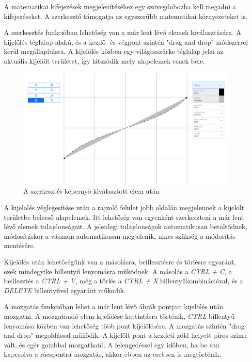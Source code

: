 A matematikai kifejezések megjelenítéséhez egy szövegdobozba kell megadni a kifejezéseket. A szerkesztő támogatja az egyszerűbb matematikai környezeteket is.



A szerkesztés funkcióban lehetőség van a már lent lévő elemek kiválasztására. A kijelölés téglalap alakú, és a kezdő- és végpont szintén "drag and drop" módszerrel kerül megállapításra. A kijelölés közben egy világosszürke téglalap jelzi az aktuális kijelölt területet, így látszódik mely alapelemek esnek bele.

\begin{figure}[!h]
	\label{fig:edit}
	\centering
	\includegraphics[width=\textwidth]{images/editor_edit.png}
	\caption{A szerkesztés képernyő kiválasztott elem után}
\end{figure}

A kijelölés véglegesítése után a rajzoló felület jobb oldalán megjelennek a kijelölt területbe beleeső alapelemek. Itt lehetőség van egyenként szerkeszteni a már lent lévő elemek tulajdonságait. A jelenlegi tulajdonságok automatikusan betöltődnek, módosításkor a vásznon automatikusan megjelenik, nincs szükség a módosítás mentésére.

Kijelölés után lehetőségünk van a másolásra, beillesztésre és törlésre egyaránt, ezek mindegyike billentyű lenyomásra működnek. A másolás a  \textit{CTRL + C}, a beillesztés a \textit{CTRL + V}, még a törlés a \textit{CTRL + X} billentyűkombinációval, és a \textit{DELETE} billentyűvel egyaránt működik.


A mozgatás funkcióban lehet a már lent lévő ábrák pontjait kijelölés után mozgatni. A mozgatandó elem kijelölése kattintásra történik, \textit{CTRL} billentyű lenyomása közben van lehetőség több pont kijelölésére. A mozgatás szintén "drag and drop" megoldással működik. A kijelölt pont a kezdeti zöld helyett piros színre vált, és egér gombbal mozgatható. A felengedéssel egy időben, ha be van kapcsolva a rácspontra mozgatás, akkor ebben az esetben is megtörténik.

